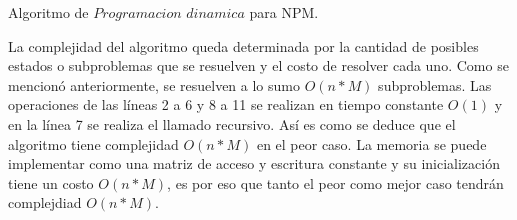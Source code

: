 \begin{algorithm}
    \begin{algorithmic}[1]
            \EndIf
            \EndIf
            \EndIf
            \EndIf
        \EndFunction
    \end{algorithmic}
    \caption{Algoritmo de $Programacion$ $dinamica$ para NPM.}
    \label{alg:programacion_dinamica}
\end{algorithm}

La complejidad del algoritmo queda determinada por la cantidad de posibles estados o subproblemas que se resuelven y el costo de resolver cada uno. Como se mencionó anteriormente, se resuelven a lo sumo $O(n*M)$ subproblemas. Las operaciones de las líneas 2 a 6 y 8 a 11 se realizan en tiempo constante $O(1)$ y en la línea 7 se realiza el llamado recursivo. Así es como se deduce que el algoritmo tiene complejidad $O(n*M)$ en el peor caso. La memoria se puede implementar como una matriz de acceso y escritura constante y su inicialización tiene un costo $O(n*M)$, es por eso que tanto el peor como mejor caso tendrán complejdiad $O(n*M)$.

